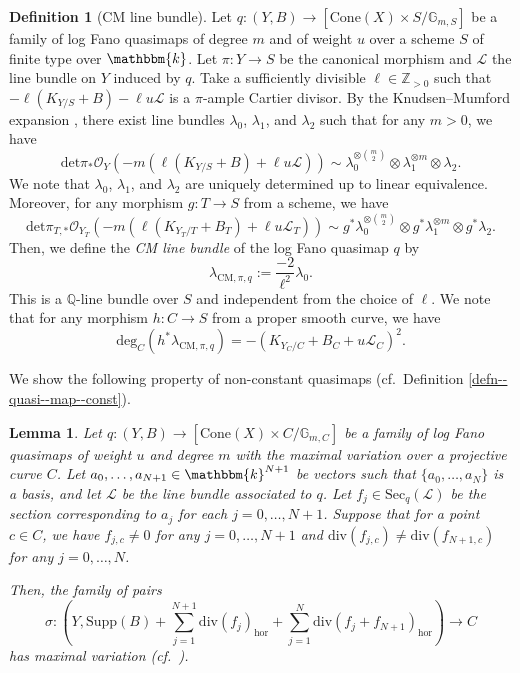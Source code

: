 \documentclass[12pt,twoside]{amsart}
\newtheorem{lem}[thm]{Lemma}
\theoremstyle{definition}
\newtheorem{defn}[thm]{Definition}
\begin{document}
\begin{defn}[CM line bundle]\label{defn--qmaps--CM--linebundle}
   Let $q\colon (Y,B)\to [\mathrm{Cone}(X)\times S/\mathbb{G}_{m,S}]$ be a family of log Fano quasimaps of degree $m$ and of weight $u$ over a scheme $S$ of finite type over $\mathbbm{k}$.
   Let $\pi\colon Y\to S$ be the canonical morphism and $\mathscr{L}$ the line bundle on $Y$ induced by $q$.
   Take a sufficiently divisible $\ell\in\mathbb{Z}_{>0}$ such that $-\ell(K_{Y/S}+B)-\ell u\mathscr{L}$ is a $\pi$-ample Cartier divisor.
   By the Knudsen--Mumford expansion \cite{KM}, there exist line bundles $\lambda_0$, $\lambda_1$, and $\lambda_2$ such that for any $m>0$, we have
   \[
   \mathrm{det}\pi_*\mathcal{O}_Y(-m(\ell(K_{Y/S}+B)+\ell u\mathscr{L}))\sim\lambda_0^{\otimes\binom{m}{2}}\otimes\lambda_1^{\otimes m}\otimes \lambda_2.
   \]
   We note that $\lambda_0$, $\lambda_1$, and $\lambda_2$ are uniquely determined up to linear equivalence.
   Moreover, for any morphism $g\colon T\to S$ from a scheme, we have
  \[
   \mathrm{det}\pi_{T,*}\mathcal{O}_{Y_T}(-m(\ell(K_{Y_T/T}+B_T)+\ell u\mathscr{L}_T))\sim g^*\lambda_{0}^{\otimes\binom{m}{2}}\otimes g^*\lambda_1^{\otimes m}\otimes g^*\lambda_2.
   \]
   Then, we define the {\em CM line bundle} of the log Fano quasimap $q$ by
   \[
   \lambda_{\mathrm{CM},\pi,q}:=\frac{-2}{\ell^2}\lambda_0.
   \]
   This is a $\mathbb{Q}$-line bundle over $S$ and independent from the choice of $\ell$.
   We note that for any morphism $h\colon C\to S$ from a proper smooth curve, we have 
   $$\mathrm{deg}_C(h^*\lambda_{\mathrm{CM},\pi,q})=-(K_{Y_C/C}+B_C+u\mathscr{L}_C)^2.$$
\end{defn}

We show the following property of non-constant quasimaps (cf.~Definition \ref{defn--quasi--map--const}).

\begin{lem}\label{lem--maximal-variation-from-qmaps-to-pairs}
    Let $q\colon(Y,B)\to[\mathrm{Cone}(X)\times C/\mathbb{G}_{m,C}]$ be a family of log Fano quasimaps of weight $u$ and degree $m$ with the maximal variation over a projective curve $C$. 
    Let $a_0,\ldots,a_{N+1}\in\mathbbm{k}^{N+1}$ be vectors such that $\{a_0,\ldots,a_N\}$ is a basis, and let $\mathscr{L}$ be the line bundle associated to $q$. 
    Let $f_{j}\in\mathrm{Sec}_{q}(\mathscr{L})$ be the section corresponding to $a_j$ for each $j=0,\ldots,N+1$.
    Suppose that for a point $c\in C$, we have $f_{j,c}\ne0$ for any $j=0,\ldots,N+1$ and $\mathrm{div}(f_{j,c})\ne\mathrm{div}(f_{N+1,c})$ for any $j=0,\ldots,N$.

Then, the family of pairs $$\sigma\colon\left(Y,\mathrm{Supp}(B)+\sum_{j=1}^{N+1}\mathrm{div}(f_j)_{\mathrm{hor}}+\sum_{j=1}^N\mathrm{div}(f_j+f_{N+1})_{\mathrm{hor}}\right)\to C$$ has maximal variation (cf.~\cite[Definition 2.20]{Hat23}).
    \end{lem}
\end{document}
